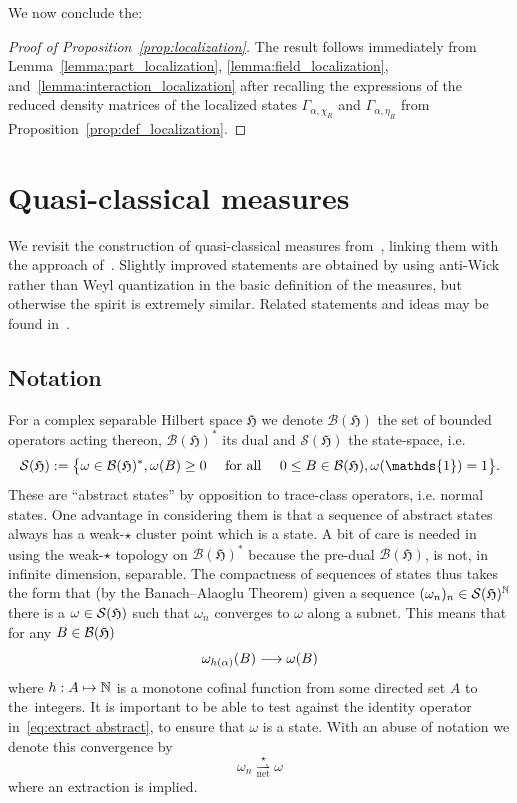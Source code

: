 \documentclass[AHL,Unicode,longabstracts,published]{cedram}
\newcommand{\cS}{\mathcal{S}}
\newcommand{\bN}{\mathbb{N}}
\newcommand{\gH}{\mathfrak{H}}
\newcommand{\cB}{\mathcal{B}}
\newcommand{\1}{\mathds{1}}
\newcommand{\cvnet}{\overset{\star}{\underset{\mathrm{net}}{\rightharpoonup}}}
\let\oldin\in
\renewcommand{\in}{\mathchoice{\oldin}{\oldin}{\,\oldin\,}{\,\oldin\,}}
\renewcommand*{\to}{\mathchoice{\longrightarrow}{\rightarrow}{\rightarrow}{\rightarrow}}
\let\oldmapsto\mapsto
\renewcommand*{\mapsto}{\mathchoice{\longmapsto}{\oldmapsto}{\oldmapsto}{\oldmapsto}}
\begin{document}
We now conclude the:
\begin{proof}[Proof of Proposition~\ref{prop:localization}]
The result follows immediately from Lemma~\ref{lemma:part_localization}, \ref{lemma:field_localization}, and~\ref{lemma:interaction_localization} after recalling the expressions of the reduced density matrices of the localized states $\Gamma_{\alpha,\chi_R}$ and $\Gamma_{\alpha,\eta_R}$ from Proposition~\ref{prop:def_localization}.
\end{proof}

\section{Quasi-classical measures} \label{sect:deF}

We revisit the construction of quasi-classical measures from~\cite{CorFalOli-20,CorFalOli-19,Falconi-18b,Falconi-18a}, linking them with the approach of~\cite{LewNamRou-14d}. Slightly improved statements are obtained by using anti-Wick rather than Weyl quantization in the basic definition of the measures, but otherwise the spirit is extremely similar. Related statements and ideas may be found in~\cite{FanLewVer-88}.

\subsection{Notation}

For a complex separable Hilbert space $\gH$ we denote $\cB (\gH)$ the set of bounded operators acting thereon, $\cB (\gH)^*$ its dual and $\cS (\gH)$ the state-space, i.e.
\begin{equation}\label{eq:states}
\cS (\gH) := \bigl\{ \omega \in \cB (\gH)^*, \omega (B) \geq 0\quad \text{ for all }\quad 0 \leq B \in \cB (\gH), \omega (\1) = 1 \bigr\}.
\end{equation}
These are ``abstract states'' by opposition to trace-class operators, i.e. normal states. One advantage in considering them is that a sequence of abstract states always has a weak-$\star$ cluster point which is a state. A bit of care is needed in using the weak-$\star$ topology on $\cB (\gH)^*$ because the pre-dual $\cB (\gH)$, is not, in infinite dimension, separable. The compactness of sequences of states thus takes the form that (by the Banach--Alaoglu Theorem) given a sequence $(\omega_n)_n\in \cS (\gH)^\bN$ there is a $\omega\in \cS (\gH)$ such that $\omega_n$ converges to $\omega$ along a subnet. This means that for any $B\in \cB(\gH)$
\begin{equation}\label{eq:extract abstract}
\omega_{h(\alpha)} (B) \to \omega (B)
\end{equation}
where $h:A\mapsto \bN$ is a monotone cofinal function from some directed set $A$ to the~integers. It is important to be able to test against the identity operator in~\eqref{eq:extract abstract}, to ensure that $\omega$ is a state. With an abuse of notation we denote this convergence by
\begin{equation}\label{eq:CV net}
\omega_n \cvnet \omega
\end{equation}
where an extraction is implied.
\end{document}
